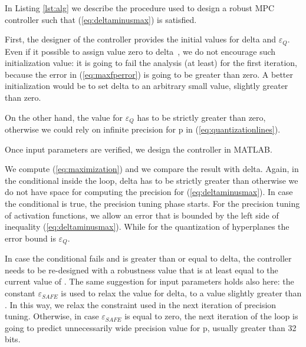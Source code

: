 In Listing \ref{lst:alg} we describe the procedure used to design a robust MPC controller such that (\ref{eq:deltaminusmax}) is satisfied.


First, the designer of the controller provides the initial values for delta and $\varepsilon_{Q}$. Even if it possible to assign value zero to delta~\cite{imperialrmpc}, we do not encourage such initialization value: it is going to fail the analysis (at least) for the first iteration, because the error in (\ref{eq:maxfperror}) is going to be greater than zero. A better initialization would be to set delta to an arbitrary small value, slightly greater than zero.

On the other hand, the value for $\varepsilon_{Q}$ has to be strictly greater than zero, otherwise we could rely on infinite precision for p in (\ref{eq:quantizationlines}).

Once input parameters are verified, we design the controller in MATLAB. 

We compute (\ref{eq:maximization}) and we compare the result with delta. Again, in the conditional inside the loop, delta has to be strictly greater than \maxUij\space otherwise we do not have space for computing the precision for (\ref{eq:deltaminusmax}). In case the conditional is true,
the precision tuning phase starts.
For the precision tuning of activation functions, we allow an error that is bounded by the left side of inequality (\autoref{eq:deltaminusmax}). While for the quantization of hyperplanes the error bound is $\varepsilon_{Q}$.

In case the conditional fails and \maxUij is greater than or equal to delta, the controller needs to be re-designed with a robustness value that is at least equal to the current value of \maxUij. The same suggestion for input parameters holds also here: the constant $\varepsilon_{SAFE}$ is used to relax the value for delta, to a value slightly greater than \maxUij. In this way, we relax the constraint used in the next iteration of precision tuning. Otherwise, in case $\varepsilon_{SAFE}$ is equal to zero, the next iteration of the loop is going to predict unnecessarily wide precision value for p, usually greater than 32 bits. 